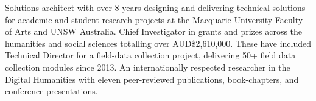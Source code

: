 
Solutions architect with over 8 years designing and delivering technical solutions for academic and student research projects at the Macquarie University Faculty of Arts and UNSW Australia. Chief Investigator in grants and prizes across the humanities and social sciences totalling over AUD\$2,610,000. These have included Technical Director for a field-data collection project, delivering 50+ field data collection modules since 2013. An internationally respected researcher in the Digital Humanities with eleven peer-reviewed publications, book-chapters, and conference presentations.


